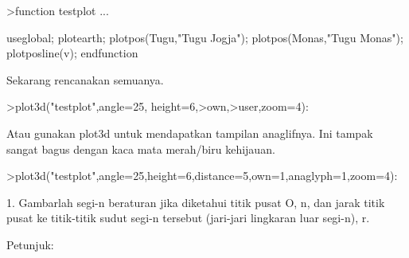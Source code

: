 \documentclass[a4paper,10pt]{article}
\begin{document}
\begin{eulernotebook}
\begin{eulercomment}
\begin{eulercomment}
\begin{eulercomment}
\begin{eulercomment}
\begin{eulercomment}
\begin{eulercomment}
\begin{eulercomment}
\begin{eulercomment}
\begin{eulercomment}
\begin{eulercomment}
\begin{eulercomment}
\begin{eulercomment}
\begin{eulercomment}
\begin{eulercomment}
\begin{eulercomment}
\begin{eulercomment}
\begin{eulercomment}
\begin{eulercomment}
\begin{eulerprompt}
>function testplot ...
\end{eulerprompt}
\begin{eulerudf}
  useglobal;
  plotearth;
  plotpos(Tugu,"Tugu Jogja"); plotpos(Monas,"Tugu Monas");
  plotposline(v);
  endfunction
\end{eulerudf}
\begin{eulercomment}
Sekarang rencanakan semuanya.
\end{eulercomment}
\begin{eulerprompt}
>plot3d("testplot",angle=25, height=6,>own,>user,zoom=4):
\end{eulerprompt}
\begin{eulercomment}
Atau gunakan plot3d untuk mendapatkan tampilan anaglifnya. Ini tampak
sangat bagus dengan kaca mata merah/biru kehijauan.
\end{eulercomment}
\begin{eulerprompt}
>plot3d("testplot",angle=25,height=6,distance=5,own=1,anaglyph=1,zoom=4):
\end{eulerprompt}
\begin{eulercomment}
1. Gambarlah segi-n beraturan jika diketahui titik pusat O, n, dan
jarak titik pusat ke titik-titik sudut segi-n tersebut (jari-jari
lingkaran luar segi-n), r.

Petunjuk:


\end{eulercomment}
\end{eulercomment}
\end{eulercomment}
\end{eulercomment}
\end{eulercomment}
\end{eulercomment}
\end{eulercomment}
\end{eulercomment}
\end{eulercomment}
\end{eulercomment}
\end{eulercomment}
\end{eulercomment}
\end{eulercomment}
\end{eulercomment}
\end{eulercomment}
\end{eulercomment}
\end{eulercomment}
\end{eulercomment}
\end{eulercomment}
\end{eulernotebook}
\end{document}
